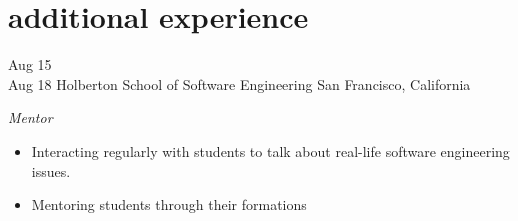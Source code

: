 \documentclass[]{cv-style}          %
\begin{document}

\section{additional experience}
\begin{entrylist}
\entry
{Aug 15\\Aug 18}
{Holberton School of Software Engineering}
{San Francisco, California}
{\emph{Mentor} \\
\vspace{-10pt}\begin{itemize}
\item Interacting regularly with students to talk about real-life software engineering issues.
\item Mentoring students through their formations
\end{itemize}}


\end{entrylist}
\end{document}
